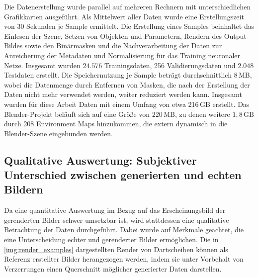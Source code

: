 Die Datenerstellung wurde parallel auf mehreren Rechnern mit unterschiedlichen Grafikkarten ausgeführt. Als Mittelwert aller Daten wurde eine Erstellungszeit von 30 Sekunden je Sample ermittelt. Die Erstellung eines Samples beinhaltet das Einlesen der Szene, Setzen von Objekten und Parametern, Rendern des Output-Bildes sowie den Binärmasken und die Nachverarbeitung der Daten zur Anreicherung der Metadaten und Normalisierung für das Training neuronaler Netze. Insgesamt wurden $24.576$ Trainingsdaten, 256 Validierungsdaten und $2.048$ Testdaten erstellt. Die Speichernutzung je Sample beträgt durchschnittlich 8\,MB, wobei die Datenmenge durch Entfernen von Masken, die nach der Erstellung der Daten nicht mehr verwendet werden, weiter reduziert werden kann. Insgesamt wurden für diese Arbeit Daten mit einem Umfang von etwa 216\,GB erstellt. Das Blender-Projekt beläuft sich auf eine Größe von $220\,\text{MB}$, zu denen weitere $1,8\,\text{GB}$ durch 208 Environment Maps hinzukommen, die extern dynamisch in die Blender-Szene eingebunden werden.

\subsection[Qualitative Auswertung]{Qualitative Auswertung: Subjektiver Unterschied zwischen generierten und echten Bildern}  %
\label{sec:rendering_qualitativ}

Da eine quantitative Auswertung im Bezug auf das Erscheinungsbild der gerenderten Bilder schwer umsetzbar ist, wird stattdessen eine qualitative Betrachtung der Daten durchgeführt. Dabei wurde auf Merkmale geachtet, die eine Unterscheidung echter und gerenderter Bilder ermöglichen. Die in \autoref{img:render_examples} dargestellten Render von Dartscheiben können als Referenz erstellter Bilder herangezogen werden, indem sie unter Vorbehalt von Verzerrungen einen Querschnitt möglicher generierter Daten darstellen.

